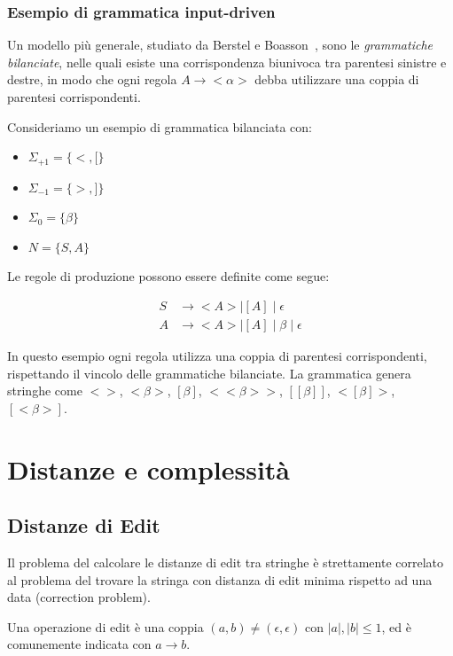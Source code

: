 \documentclass[a4paper,12pt]{report}
\theoremstyle{propositionstyle}
\begin{document}
    \subsection{Esempio di grammatica input-driven}

    Un modello più generale, studiato da Berstel e Boasson~\cite{berstel-boasson}, sono le \textit{grammatiche bilanciate}, nelle quali esiste una corrispondenza biunivoca tra parentesi sinistre e destre, in modo che ogni regola $A \rightarrow <\alpha>$ debba utilizzare una coppia di parentesi corrispondenti.

    Consideriamo un esempio di grammatica bilanciata con:
    \begin{itemize}
        \item $\Sigma_{+1} = \{<, [\}$
        \item $\Sigma_{-1} = \{>, ]\}$
        \item $\Sigma_0 = \{\beta\}$
        \item $N = \{S, A\}$
    \end{itemize}

    Le regole di produzione possono essere definite come segue:

    \begin{align}
        S &\rightarrow < A > \mid [A] \mid \epsilon \\
        A &\rightarrow < A > \mid [A] \mid \beta \mid \epsilon
    \end{align}

    In questo esempio ogni regola utilizza una coppia di parentesi corrispondenti, rispettando il vincolo delle grammatiche bilanciate. La grammatica genera stringhe come $<>$, $<\beta>$, $[\beta]$, $<<\beta>>$, $[[\beta]]$, $<[\beta]>$, $[<\beta>]$.


    \chapter{Distanze e complessità}


    \section{Distanze di Edit}

    Il problema del calcolare le distanze di edit tra stringhe è strettamente correlato al problema del trovare la stringa con distanza di edit minima rispetto ad una data (correction problem).

    Una operazione di edit è una coppia $(a, b) \neq (\epsilon, \epsilon)$ con $|a|, |b| \leq 1$, ed è comunemente indicata con $a \rightarrow b$.
\end{document}
